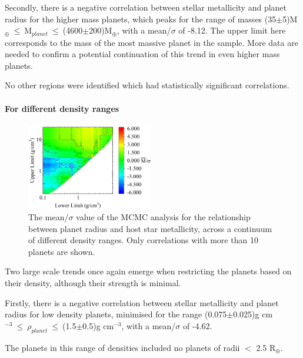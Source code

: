 \documentclass[a4paper,twocolumn,12pt]{article}
\begin{document}
Secondly, there is a negative correlation between stellar metallicity and planet radius for the higher mass planets, which peaks for the range of masses (35$\pm$5)M$_{\oplus}~\leq~$M$_{planet}~\leq~$(4600$\pm$200)M$_{\oplus}$, with a mean/$\sigma$ of -8.12. The upper limit here corresponds to the mass of the most massive planet in the sample. More data are needed to confirm a potential continuation of this trend in even higher mass planets.


No other regions were identified which had statistically significant correlations. 




\paragraph{For different density ranges}
\begin{figure}[h!]
    \centering
    \includegraphics[width=0.49\textwidth]{Graphs/FeH vs Radius correlations - Density ranges.png}
    \caption{The mean/$\sigma$ value of the MCMC analysis for the relationship between planet radius and host star metallicity, across a continuum of different density ranges. Only correlations with more than 10 planets are shown.}
    \label{figure: Fe/H vs Radius correlations - Density ranges}
\end{figure}
Two large scale trends once again emerge when restricting the planets based on their density, although their strength is minimal.

Firstly, there is a negative correlation between stellar metallicity and planet radius for low density planets, minimised for the range (0.075$\pm$0.025)g cm$^{-3}~\leq~\rho_{planet}~\leq~$(1.5$\pm$0.5)g cm$^{-3}$, with a mean/$\sigma$ of -4.62.

The planets in this range of densities included no planets of radii $<$ 2.5 R$_{\oplus}$. %
\end{document}
